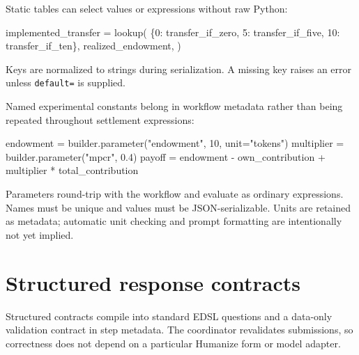 \documentclass[
  10pt,
]{report}
\newenvironment{Shaded}{}{}
\newcommand{\DecValTok}[1]{\textcolor[rgb]{0.25,0.63,0.44}{#1}}
\newcommand{\FloatTok}[1]{\textcolor[rgb]{0.25,0.63,0.44}{#1}}
\newcommand{\NormalTok}[1]{#1}
\newcommand{\OperatorTok}[1]{\textcolor[rgb]{0.40,0.40,0.40}{#1}}
\newcommand{\StringTok}[1]{\textcolor[rgb]{0.25,0.44,0.63}{#1}}
\begin{document}
Static tables can select values or expressions without raw Python:

\begin{Shaded}
\begin{Highlighting}[]
\NormalTok{implemented\_transfer }\OperatorTok{=}\NormalTok{ lookup(}
\NormalTok{    \{}\DecValTok{0}\NormalTok{: transfer\_if\_zero, }\DecValTok{5}\NormalTok{: transfer\_if\_five, }\DecValTok{10}\NormalTok{: transfer\_if\_ten\},}
\NormalTok{    realized\_endowment,}
\NormalTok{)}
\end{Highlighting}
\end{Shaded}

Keys are normalized to strings during serialization. A missing key
raises an error unless \texttt{default=} is supplied.

Named experimental constants belong in workflow metadata rather than
being repeated throughout settlement expressions:

\begin{Shaded}
\begin{Highlighting}[]
\NormalTok{endowment }\OperatorTok{=}\NormalTok{ builder.parameter(}\StringTok{"endowment"}\NormalTok{, }\DecValTok{10}\NormalTok{, unit}\OperatorTok{=}\StringTok{"tokens"}\NormalTok{)}
\NormalTok{multiplier }\OperatorTok{=}\NormalTok{ builder.parameter(}\StringTok{"mpcr"}\NormalTok{, }\FloatTok{0.4}\NormalTok{)}
\NormalTok{payoff }\OperatorTok{=}\NormalTok{ endowment }\OperatorTok{{-}}\NormalTok{ own\_contribution }\OperatorTok{+}\NormalTok{ multiplier }\OperatorTok{*}\NormalTok{ total\_contribution}
\end{Highlighting}
\end{Shaded}

Parameters round-trip with the workflow and evaluate as ordinary
expressions. Names must be unique and values must be JSON-serializable.
Units are retained as metadata; automatic unit checking and prompt
formatting are intentionally not yet implied.

\chapter{Structured response
contracts}\label{structured-response-contracts}

Structured contracts compile into standard EDSL questions and a
data-only validation contract in step metadata. The coordinator
revalidates submissions, so correctness does not depend on a particular
Humanize form or model adapter.
\end{document}
